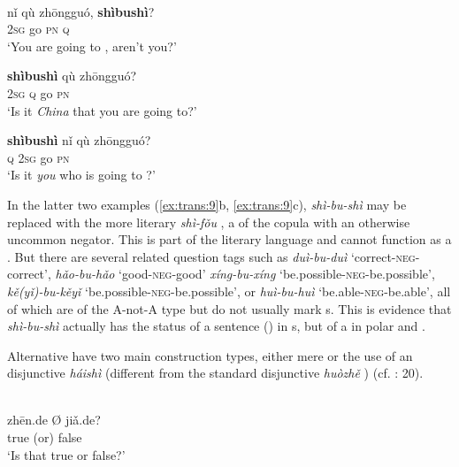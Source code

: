 \ea%
    \label{ex:trans:9}
    \\
    \ea
    \gll nǐ  qù  zhōngguó, \textbf{{shìbushì}}?\\
    2\textsc{sg}  go  \textsc{pn}    \textsc{q}\\
    \glt ‘You are going to , aren’t you?’
    
    \ex
     \textbf{{shìbushì}} qù  zhōngguó?\\
    2\textsc{sg}  \textsc{q}    go  \textsc{pn}\\
    \glt ‘Is it \textit{China} that you are going to?’
    
    \ex
    \gll \textbf{{shìbushì}} nǐ  qù  zhōngguó?\\
    \textsc{q}    2\textsc{sg}  go  \textsc{pn}\\
    \glt ‘Is it \textit{you} who is going to ?’\z\z

\noindent In the latter two examples (\ref{ex:trans:9}b, \ref{ex:trans:9}c), \textit{shì-bu-shì} may be replaced with the more literary \textit{shì-fǒu} , a  of the copula with an otherwise uncommon negator. This is part of the literary language and cannot function as a . But there are several related question tags such as \textit{duì-}\textit{bu-}\textit{duì}  ‘correct-\textsc{neg}-correct’, \textit{hǎo-bu-hǎo}  ‘good-\textsc{neg}-good’ \textit{xíng-bu-xíng}  ‘be.possible-\textsc{neg}-be.possible’, \textit{kě(yǐ)-bu-kěyǐ}  ‘be.possible-\textsc{neg}-be.possible’, or \textit{huì-}\textit{bu-}\textit{huì}  ‘be.able-\textsc{neg}-be.able’, all of which are of the A-not-A type but do not usually mark s. This is evidence that \textit{shì-bu-shì} actually has the status of a sentence () in s, but of a  in polar and  .

Alternative  have two main construction types, either mere  or the use of an  disjunctive \textit{háishì}  (different from the standard disjunctive \textit{huòzhě} ) (cf. \citealt{Hölzl2016a}: 20).

\ea%
    \label{ex:trans:10}
    \\
    \ea
    \gll zh\=en.de  Ø  jiǎ.de?\\
    true    (or)  false\\
    \glt ‘Is that true or false?’

